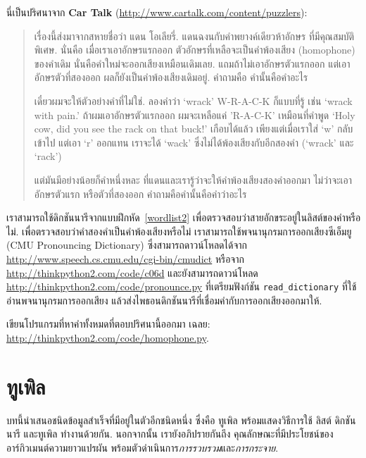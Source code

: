 \begin{exercise}

นี่เป็นปริศนาจาก \textbf{Car Talk} 
(\url{http://www.cartalk.com/content/puzzlers}):

\begin{quote}
เรื่องนี้ส่งมาจากสหายชื่อว่า แดน โอเลียรี่.
แดนฉงนกับคำพยางค์เดียวห้าอักษร ที่มีคุณสมบัติพิเศษ.
นั่นคือ เมื่อเราเอาอักษรแรกออก ตัวอักษรที่เหลือจะเป็นคำพ้องเสียง (homophone) ของคำเดิม นั่นคือคำใหม่จะออกเสียงเหมือนเดิมเลย.
แถมถ้าไม่เอาอักษรตัวแรกออก แต่เอาอักษรตัวที่สองออก
ผลก็ยังเป็นคำพ้องเสียงเดิมอยู่.
คำถามคือ คำนั้นคือคำอะไร

เดี๋ยวผมจะให้ตัวอย่างคำที่ไม่ใช่. 
ลองคำว่า `wrack' W-R-A-C-K ก็แบบที่รู้ เช่น `wrack with
pain.' 
ถ้าผมเอาอักษรตัวแรกออก ผมจะเหลือแค่ 'R-A-C-K' เหมือนที่คำพูด `Holy cow, did you see the rack on that buck!'
เกือบได้แล้ว 
เพียงแต่เมื่อเราใส่ `w' กลับเข้าไป แต่เอา `r' ออกแทน
เราจะได้ `wack' ซึ่งไม่ได้พ้องเสียงกับอีกสองคำ (`wrack' และ `rack')

แต่มันมีอย่างน้อยก็คำหนึ่งหละ ที่แดนและเรารู้ว่าจะให้คำพ้องเสียงสองคำออกมา 
ไม่ว่าจะเอาอักษรตัวแรก หรือตัวที่สองออก คำถามคือคำนั้นคือคำว่าอะไร
\end{quote}

เราสามารถใช้ดิกชันนารีจากแบบฝึกหัด~\ref{wordlist2} 
เพื่อตรวจสอบว่าสายอักขระอยู่ในลิสต์ของคำหรือไม่.
เพื่อตรวจสอบว่าคำสองคำเป็นคำพ้องเสียงหรือไม่
เราสามารถใช้พจนานุกรมการออกเสียงซีเอ็มยู (CMU
Pronouncing Dictionary)
ซึ่งสามารถดาวน์โหลดได้จาก
\url{http://www.speech.cs.cmu.edu/cgi-bin/cmudict} 
หรือจาก
\url{http://thinkpython2.com/code/c06d} 
และยังสามารถดาวน์โหลด
\url{http://thinkpython2.com/code/pronounce.py}
ที่เตรียมฟังก์ชัน \verb"read_dictionary" ที่ใช้อ่านพจนานุกรมการออกเสียง
แล้วส่งไพธอนดิกชันนารีที่เชื่อมคำกับการออกเสียงออกมาให้.

เขียนโปรแกรมที่หาคำทั้งหมดที่ตอบปริศนานี้ออกมา
เฉลย: \url{http://thinkpython2.com/code/homophone.py}.

\end{exercise}
\vspace{0.5cm}



\chapter{ทูเพิล}
\label{tuplechap}

บทนี้นำเสนอชนิดข้อมูลสำเร็จที่มีอยู่ในตัวอีกชนิดหนึ่ง ซึ่งคือ ทูเพิล
พร้อมแสดงวิธีการใช้ ลิสต์ ดิกชันนารี และทูเพิล ทำงานด้วยกัน.
%
%
นอกจากนั้น เรายังอภิปรายกันถึง
คุณลักษณะที่มีประโยชน์ของอาร์กิวเมนต์ความยาวแปรผัน
พร้อมตัวดำเนินการ\textit{การรวบรวม}และ\textit{การกระจาย}. 

